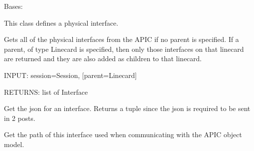 \documentclass[letterpaper,10pt,english]{sphinxmanual}
\begin{document}
\begin{fulllineitems}
\label{acitoolkit:acitoolkit.Interface}
Bases: {\hyperref[acitoolkit:acitoolkit.BaseInterface]{}}

This class defines a physical interface.

\begin{fulllineitems}
\label{acitoolkit:acitoolkit.Interface.get}
Gets all of the physical interfaces from the APIC if no parent is specified.
If a parent, of type Linecard is specified, then only those interfaces on
that linecard are returned and they are also added as children to that linecard.

INPUT: session=Session, {[}parent=Linecard{]}

RETURNS: list of Interface

\end{fulllineitems}


\begin{fulllineitems}
\label{acitoolkit:acitoolkit.Interface.get_json}
Get the json for an interface.  Returns a tuple since the json is
required to be sent in 2 posts.

\end{fulllineitems}


\begin{fulllineitems}
\label{acitoolkit:acitoolkit.Interface.get_name_for_json}
\end{fulllineitems}


\begin{fulllineitems}
\label{acitoolkit:acitoolkit.Interface.get_path}
Get the path of this interface used when communicating with
the APIC object model.

\end{fulllineitems}


\end{fulllineitems}
\end{document}
